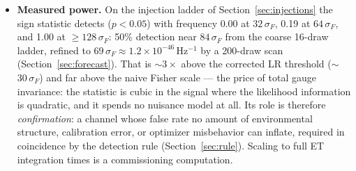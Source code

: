 \documentclass[11pt]{article}
\begin{document}
\begin{itemize}
\item \textbf{Measured power.} On the injection ladder of Section~\ref{sec:injections} the sign statistic detects ($p<0.05$) with frequency 0.00 at $32\,\sigma_F$, 0.19 at $64\,\sigma_F$, and 1.00 at $\ge 128\,\sigma_F$: 50\% detection near $84\,\sigma_F$ from the coarse 16-draw ladder, refined to $69\,\sigma_F \approx 1.2\times10^{-46}\,\mathrm{Hz^{-1}}$ by a 200-draw scan (Section~\ref{sec:forecast}). That is $\sim$$3\times$ above the corrected LR threshold ($\sim$$30\,\sigma_F$) and far above the naive Fisher scale --- the price of total gauge invariance: the statistic is cubic in the signal where the likelihood information is quadratic, and it spends no nuisance model at all. Its role is therefore \emph{confirmation}: a channel whose false rate no amount of environmental structure, calibration error, or optimizer misbehavior can inflate, required in coincidence by the detection rule (Section~\ref{sec:rule}). Scaling to full ET integration times is a commissioning computation.
\end{itemize}
\end{document}
